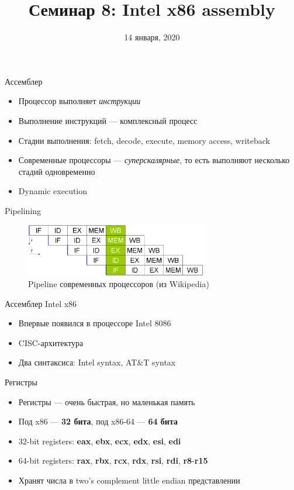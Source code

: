 \documentclass[10pt,pdf,hyperref={unicode}]{beamer}
\title{Семинар 8: Intel x86 assembly}
\date{14 января, 2020}
\begin{document}
\begin{frame}
  \titlepage
\end{frame}

\begin{frame}{Ассемблер}
    \begin{itemize}
        \item Процессор выполняет \emph{инструкции}
        \item Выполнение инструкций — комплексный процесс
        \item Стадии выполнения: fetch, decode, execute, memory access, writeback
        \item Современные процессоры — \emph{суперскалярные}, то есть выполняют несколько стадий одновременно
        \item Dynamic execution
    \end{itemize}
\end{frame}

\begin{frame}{Pipelining}
\center\begin{figure}[!]
    \includegraphics[width=300px]{pipeline.png}
    \caption{Pipeline современных процессоров (из Wikipedia)}
\end{figure}
\end{frame}

\begin{frame}{Ассемблер Intel x86}
    \begin{itemize}
        \item Впервые появился в процессоре Intel 8086
        \item CISC-архитектура
        \item Два синтаксиса: Intel syntax, AT\&T syntax
    \end{itemize}
\end{frame}


\begin{frame}{Регистры}
\begin{itemize}
    \item Регистры — очень быстрая, но маленькая память
    \item Под x86 — \textbf{32 бита}, под x86-64 — \textbf{64 бита}
    \item 32-bit registers: \textbf{eax}, \textbf{ebx}, \textbf{ecx}, \textbf{edx}, \textbf{esi}, \textbf{edi}
    \item 64-bit registers: \textbf{rax}, \textbf{rbx}, \textbf{rcx}, \textbf{rdx}, \textbf{rsi}, \textbf{rdi}, \textbf{r8}-\textbf{r15}
    \item Хранят числа в two's complement little endian представлении
\end{itemize}
\end{frame}
\end{document}
